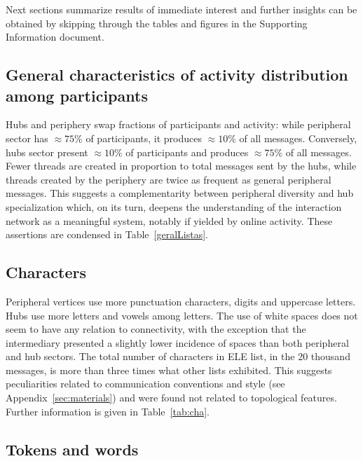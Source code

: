 \documentclass[%
 aip,
 jmp,%
 amsmath,amssymb,
 reprint,%
]{revtex4-1}
\begin{document}
Next sections summarize results of immediate interest
and further insights can be obtained by skipping through
the tables and figures in the Supporting Information document.

\subsection{General characteristics of activity distribution among participants}\label{sec:gen}

Hubs and periphery swap fractions of participants and activity:
while peripheral sector has $\approx 75\%$ of participants, it produces $\approx 10\%$ of all messages.
Conversely, hubs sector present $\approx 10\%$ of participants and produces $\approx 75\%$ of all messages.
Fewer threads are created in proportion to total messages sent by the hubs,
while threads created by the periphery are twice as frequent as general peripheral messages.
This suggests a complementarity between peripheral diversity and hub specialization
which, on its turn, deepens the understanding of the interaction network as a meaningful system, 
notably if yielded by online activity.
These assertions are condensed in Table~\ref{geralListas}.


\subsection{Characters}\label{sec:cha}

Peripheral vertices use more punctuation characters, digits and uppercase letters.
Hubs use more letters and vowels among letters.
The use of white spaces does not seem to have any relation to connectivity, with the exception that the intermediary presented a slightly lower incidence of spaces than both peripheral and hub sectors. 
The total number of characters in ELE list,
in the 20 thousand messages,
is more than three times what other lists exhibited.
This suggests peculiarities related to communication conventions and style (see Appendix~\ref{sec:materials}) and were found not related to topological features.
Further information is given in Table~\ref{tab:cha}.

\subsection{Tokens and words}\label{subsec:tw}
%

\end{document}
